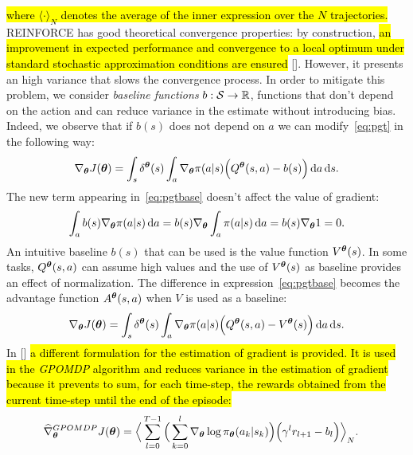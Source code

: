 \hl{where $\langle \cdot \rangle_{N}$ denotes the average of the inner expression over the $N$ trajectories.}\\
\newline
REINFORCE has good theoretical convergence properties: by construction, \hl{an improvement in expected performance and convergence to a local optimum under standard stochastic approximation conditions are ensured} [\cite{sutton2018reinforcement}]. However, it presents an high variance that slows the convergence process. In order to mitigate this problem, we consider \emph{baseline functions} $b: \mathcal{S} \to \mathbb{R}$, \ie functions that don't depend on the action and can reduce variance in the estimate without introducing bias.
Indeed, we observe that if $b(s)$ does not depend on $a$ we can modify~\eqref{eq:pgt} in the following way:
\begin{align} \nabla_{\boldsymbol{\theta}}J(\boldsymbol{\theta}) = \int_s \delta^{\boldsymbol{\theta}}(s) \int_a \nabla_{\boldsymbol{\theta}} \pi(a|s) \Big( Q^{\boldsymbol{\theta}}(s,a) -b(s) \Big) \,\mathrm{d} a \,\mathrm{d} s. \label{eq:pgtbase}\end{align}
The new term appearing in~\eqref{eq:pgtbase} doesn't affect the value of gradient:
\begin{align} \int_a b(s) \nabla_{\boldsymbol{\theta}} \pi(a|s) \,\mathrm{d} a = b(s) \nabla_{\boldsymbol{\theta}} \int_a \pi(a|s) \,\mathrm{d} a = b(s) \nabla_{\boldsymbol{\theta}} 1 = 0. \end{align}
An intuitive baseline $b(s)$ that can be used is the value function $V^{\boldsymbol{\theta}}(s)$. In some tasks, $Q^{\boldsymbol{\theta}}(s,a)$ can assume high values and the use of $V^{\boldsymbol{\theta}}(s)$ as baseline provides an effect of normalization. The difference in expression~\eqref{eq:pgtbase} becomes the advantage function $A^{\boldsymbol{\theta}}(s,a)$ when $V$ is used as a baseline:
\begin{align} \nabla_{\boldsymbol{\theta}}J(\boldsymbol{\theta}) = \int_s \delta^{\boldsymbol{\theta}}(s) \int_a \nabla_{\boldsymbol{\theta}} \pi(a|s) \Big( Q^{\boldsymbol{\theta}}(s,a) - V^{\boldsymbol{\theta}}(s) \Big) \,\mathrm{d} a \,\mathrm{d} s.\end{align}
In [\cite{Peters2008ReinforcementLO}] \hl{a different formulation for the estimation of gradient is provided. It is used in the \emph{GPOMDP} algorithm and reduces variance in the estimation of gradient because it prevents to sum, for each time-step, the rewards obtained from the current time-step until the end of the episode:}
\begin{align}
\widehat{\nabla}_{\boldsymbol{\theta}}^{GPOMDP}J(\boldsymbol{\theta}) &= \Big\langle \sum_{l=0}^{T-1} \Big( \sum_{k=0}^{l} \nabla_{\boldsymbol{\theta}}\log\pi_{\boldsymbol{\theta}}(a_k|s_k)\Big)\Big(\gamma^{l}r_{l+1} - b_{l} \Big)  \Big\rangle_{N}.
\end{align}
